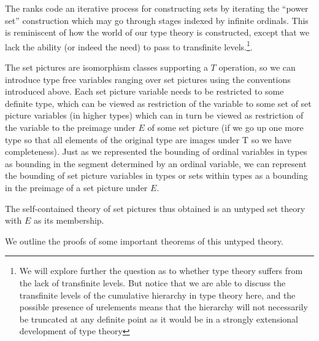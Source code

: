 \documentclass[12pt]{book}
\begin{document}
The ranks code an iterative process for constructing sets by iterating
the ``power set'' construction which may go through stages indexed by
infinite ordinals.  This is reminiscent of how the world of our type
theory is constructed, except that we lack the ability (or indeed the
need) to pass to transfinite {levels.\footnote{We will explore further
the question as to whether type theory suffers from the lack of
transfinite levels.  But notice that we are able to discuss the
transfinite levels of the cumulative hierarchy in type theory here,
and the possible presence of urelements means that the hierarchy will
not necessarily be truncated at any definite point as it would be in a
strongly extensional development of type theory}.}

The set pictures are isomorphism classes supporting a $T$ operation, so
we can introduce type free variables ranging over set pictures using
the conventions introduced above.  Each set picture variable needs to
be restricted to some definite type, which can be viewed as
restriction of the variable to some set of set picture variables (in
higher types) which can in turn be viewed as restriction of the
variable to the preimage under $E$ of some set picture (if we go up
one more type so that all elements of the original type are images
under T so we have completeness).  Just as we represented the bounding
of ordinal variables in types as bounding in the segment determined by
an ordinal variable, we can represent the bounding of set picture
variables in types or sets within types as a bounding in the preimage
of a set picture under $E$.

The self-contained theory of set pictures thus obtained is an untyped
set theory with $E$ as its membership. 

We outline the proofs of some important theorems of this untyped theory.
\end{document}
